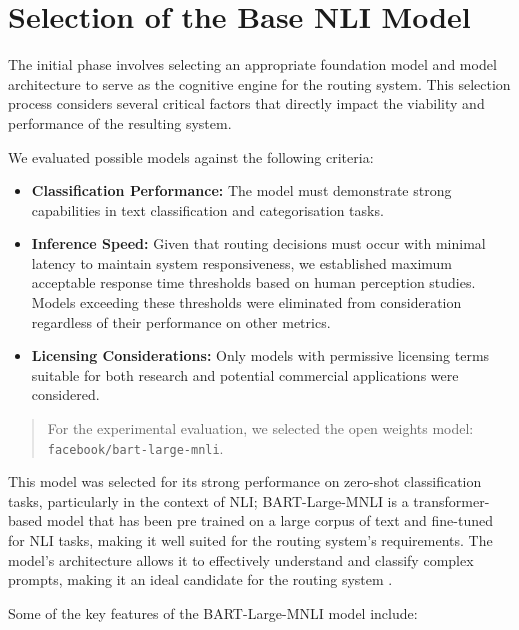 \section{Selection of the Base NLI Model}

The initial phase involves selecting an appropriate foundation model and model architecture to serve as the cognitive engine for the routing system. This selection process considers several critical factors that directly impact the viability and performance of the resulting system.

We evaluated possible models against the following criteria:

\begin{itemize}
    \item \textbf{Classification Performance:} The model must demonstrate strong capabilities in text classification and categorisation tasks.
    \item \textbf{Inference Speed:} Given that routing decisions must occur with minimal latency to maintain system responsiveness, we established maximum acceptable response time thresholds based on human perception studies. Models exceeding these thresholds were eliminated from consideration regardless of their performance on other metrics.
    \item \textbf{Licensing Considerations:} Only models with permissive licensing terms suitable for both research and potential commercial applications were considered.
\end{itemize}

\begin{quote}
    For the experimental evaluation, we selected the open weights model: \texttt{facebook/\newline bart-large-mnli}.
\end{quote}

This model was selected for its strong performance on zero-shot classification tasks, particularly in the context of NLI; BART-Large-MNLI is a transformer-based model that has been pre trained on a large corpus of text and fine-tuned for NLI tasks, making it well suited for the routing system's requirements. The model's architecture allows it to effectively understand and classify complex prompts, making it an ideal candidate for the routing system \cite{lewis2019bartdenoisingsequencetosequencepretraining}. 

Some of the key features of the BART-Large-MNLI model include:


